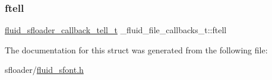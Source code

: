 \mbox{\label{struct__fluid__file__callbacks__t_ac6369333c624eda55ecb70eae31af31e}} 
\subsubsection{\texorpdfstring{ftell}{ftell}}
{\footnotesize\ttfamily \hyperlink{sfont_8h_a1b7f13d61330ca5a3441cf6c15863607}{fluid\+\_\+sfloader\+\_\+callback\+\_\+tell\+\_\+t} \+\_\+fluid\+\_\+file\+\_\+callbacks\+\_\+t\+::ftell}



The documentation for this struct was generated from the following file\+:\begin{DoxyCompactItemize}
\item 
sfloader/\hyperlink{fluid__sfont_8h}{fluid\+\_\+sfont.\+h}\end{DoxyCompactItemize}

